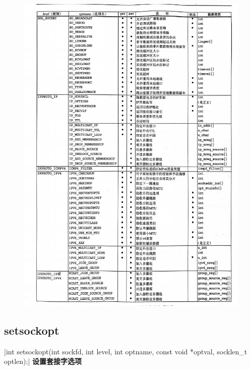 \begin{spacing}{2.0}
\begin{figure}[!htb]
\includegraphics[width=\textwidth]{Picture/getsockopt}
\end{figure}
\end{spacing}
\newpage

\subsection{setsockopt}
|int setsockopt(int sockfd, int level, int optname, const void *optval, socklen_t optlen);|
\noindent \textbf{设置套接字选项}
\newpage

